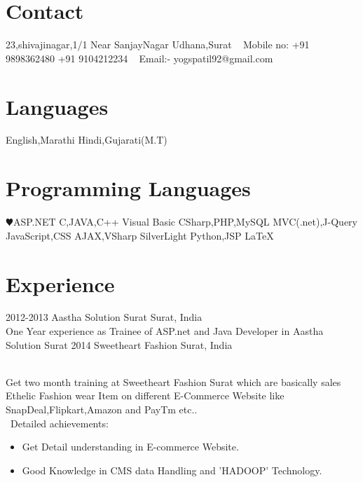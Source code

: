 \documentclass[]{cv-style}          %
\begin{document}
\lastupdated


\begin{aside}
%
\section{Contact}
23,shivajinagar,1/1
Near SanjayNagar 
Udhana,Surat
~
Mobile no:
+91 9898362480
+91 9104212234
~
Email:-
yogspatil92@gmail.com
%
\section{Languages}
English,Marathi
Hindi,Gujarati(M.T)
%
\section{Programming
   Languages}
{\color{red} $\varheartsuit$}ASP.NET
C,JAVA,C++
Visual Basic
CSharp,PHP,MySQL
MVC(.net),J-Query
JavaScript,CSS
AJAX,VSharp
SilverLight
Python,JSP
\LaTeX{}
%
\end{aside}



\section{Experience}

\begin{entrylist}
\entry
  {2012-2013}
  {Aastha Solution Surat}
  {Surat, India}
  {\\
  One Year experience as Trainee of ASP.net and Java Developer in Aastha Solution Surat}
\entry
  {2014}
  {Sweetheart Fashion}
  {Surat, India}
  {\\
  Get two month training at Sweetheart Fashion Surat which are basically sales Ethelic Fashion wear Item on different E-Commerce Website like SnapDeal,Flipkart,Amazon and PayTm etc..\\\
  Detailed achievements:
  \begin{itemize}
    \item Get Detail understanding in E-commerce Website.
     
     \item Good Knowledge in CMS data Handling and 'HADOOP' Technology.
     
     
  \end{itemize}}

\end{entrylist}
\end{document}
